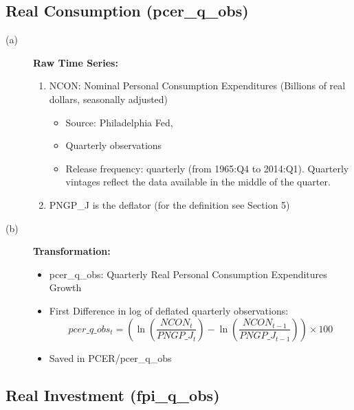 \documentclass[3p,review,times]{elsarticle}		%
\begin{document}
\subsection{Real Consumption (pcer\_q\_obs)}
\begin{description}
	\item[(a)] \textbf{Raw Time Series:}
	\begin{enumerate}
		\item NCON: Nominal Personal Consumption Expenditures (Billions of real dollars, seasonally adjusted)
		\begin{itemize}
			\item Source: Philadelphia Fed,
			\item Quarterly observations 
			\item Release frequency: quarterly (from 1965:Q4 to 2014:Q1). Quarterly vintages reflect the data available in the middle of the quarter.
		\end{itemize}
		\item PNGP\_J is the deflator (for the definition see Section 5)
	\end{enumerate}
	\item[(b)] \textbf{Transformation:}
	\begin{itemize}
		\item pcer\_q\_obs: Quarterly  Real Personal Consumption Expenditures Growth
		\item  First Difference in log of deflated quarterly observations:
		$$pcer\_q\_obs_{t}=\left(\ln\left(\frac{NCON_t}{PNGP\_J_t}\right)-\ln\left(\frac{NCON_{t-1}}{PNGP\_J_{t-1}}\right)\right)\times 100$$
		\item Saved in PCER/pcer\_q\_obs
	\end{itemize}
\end{description}
\subsection{Real Investment (fpi\_q\_obs)}
\end{document}
